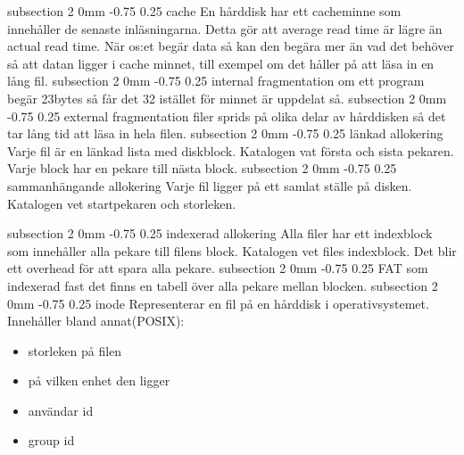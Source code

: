 \documentclass[a4paper,11pt]{article}
\makeatletter
\renewcommand{\subsection}{\@startsection
   {subsection}%
   {2}%
   {0mm}%
   {-0.75\baselineskip}%
   {0.25\baselineskip}%
   {\rmfamily\normalfont\slshape\normalsize}}%
\makeatother
\begin{document}
\subsection{cache}
En hårddisk har ett cacheminne som innehåller de senaste inläsningarna. Detta gör att average read time är lägre än actual read time. När os:et begär data så kan den begära mer än vad det behöver så att datan ligger i cache minnet, till exempel om det håller på att läsa in en lång fil.
\subsection{internal fragmentation}
om ett program begär 23bytes så får det 32 istället för minnet är uppdelat så.
\subsection{external fragmentation}
filer sprids på olika delar av hårddisken så det tar lång tid att läsa in hela filen.
\subsection{länkad allokering}
Varje fil är en länkad lista med diskblock. Katalogen vat första och sista pekaren. Varje block har en pekare till nästa block. 
\subsection{sammanhängande allokering}
Varje fil ligger på ett samlat ställe på disken. Katalogen vet startpekaren och storleken. 

\subsection{indexerad allokering}
Alla filer har ett indexblock som innehåller alla pekare till filens block. Katalogen vet files indexblock. Det blir ett overhead för att spara alla pekare.
\subsection{FAT}
som indexerad fast det finns en tabell över alla pekare mellan blocken. 
\subsection{inode}
Representerar en fil på en hårddisk i operativsystemet. Innehåller bland annat(POSIX):
\begin{itemize}
\item storleken på filen
\item på vilken enhet den ligger
\item användar id
\item group id
\end{itemize}
\end{document}

